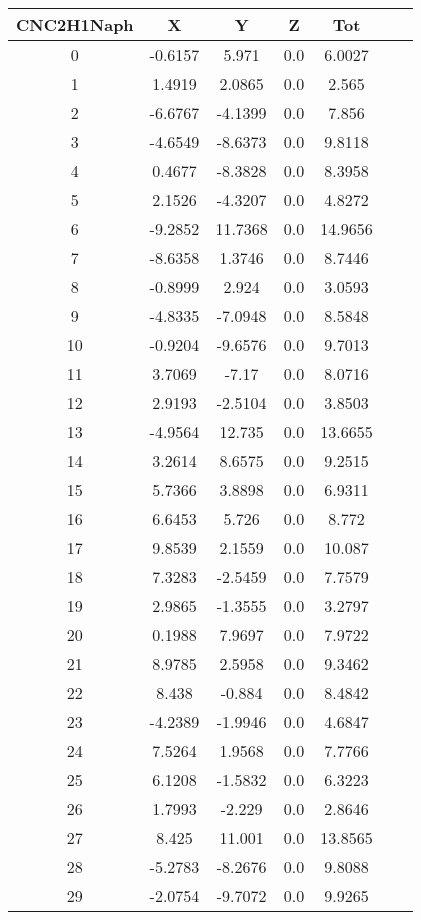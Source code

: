 \documentclass[journal=jacsat,manuscript=article]{achemso}
\begin{document}
\begin{table}
\tiny
\centering
   \begin{tabular}{ccccccc}
    \hline
CNC2H1Naph & X & Y & Z & Tot  \\
\hline
0 & -0.6157 & 5.971 & 0.0 & 6.0027 \\ 
1 & 1.4919 & 2.0865 & 0.0 & 2.565 \\ 
2 & -6.6767 & -4.1399 & 0.0 & 7.856 \\ 
3 & -4.6549 & -8.6373 & 0.0 & 9.8118 \\ 
4 & 0.4677 & -8.3828 & 0.0 & 8.3958 \\ 
5 & 2.1526 & -4.3207 & 0.0 & 4.8272 \\ 
6 & -9.2852 & 11.7368 & 0.0 & 14.9656 \\ 
7 & -8.6358 & 1.3746 & 0.0 & 8.7446 \\ 
8 & -0.8999 & 2.924 & 0.0 & 3.0593 \\ 
9 & -4.8335 & -7.0948 & 0.0 & 8.5848 \\ 
10 & -0.9204 & -9.6576 & 0.0 & 9.7013 \\ 
11 & 3.7069 & -7.17 & 0.0 & 8.0716 \\ 
12 & 2.9193 & -2.5104 & 0.0 & 3.8503 \\ 
13 & -4.9564 & 12.735 & 0.0 & 13.6655 \\ 
14 & 3.2614 & 8.6575 & 0.0 & 9.2515 \\ 
15 & 5.7366 & 3.8898 & 0.0 & 6.9311 \\ 
16 & 6.6453 & 5.726 & 0.0 & 8.772 \\ 
17 & 9.8539 & 2.1559 & 0.0 & 10.087 \\ 
18 & 7.3283 & -2.5459 & 0.0 & 7.7579 \\ 
19 & 2.9865 & -1.3555 & 0.0 & 3.2797 \\ 
20 & 0.1988 & 7.9697 & 0.0 & 7.9722 \\ 
21 & 8.9785 & 2.5958 & 0.0 & 9.3462 \\ 
22 & 8.438 & -0.884 & 0.0 & 8.4842 \\ 
23 & -4.2389 & -1.9946 & 0.0 & 4.6847 \\ 
24 & 7.5264 & 1.9568 & 0.0 & 7.7766 \\ 
25 & 6.1208 & -1.5832 & 0.0 & 6.3223 \\ 
26 & 1.7993 & -2.229 & 0.0 & 2.8646 \\ 
27 & 8.425 & 11.001 & 0.0 & 13.8565 \\ 
28 & -5.2783 & -8.2676 & 0.0 & 9.8088 \\ 
29 & -2.0754 & -9.7072 & 0.0 & 9.9265 \\ 

\end{tabular}
\end{table}
\end{document}
